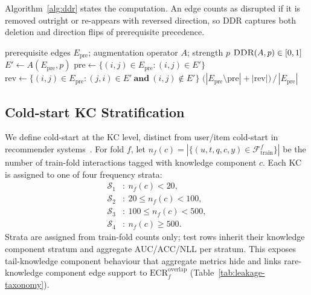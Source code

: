 \documentclass[pdflatex,sn-mathphys-num]{sn-jnl}
\newcommand{\Epre}{\ensuremath{E_{\text{pre}}}}
\newcommand{\KC}{knowledge component}
\newcommand{\DDR}{\textsc{DDR}}
\begin{document}
Algorithm~\ref{alg:ddr} states the computation. An edge counts as disrupted if
it is removed outright or re-appears with reversed direction, so \DDR{}
captures both deletion and direction flips of prerequisite precedence.

\begin{algorithm}[t]
\caption{DAG Disruption Rate (\DDR{})}
\label{alg:ddr}
\begin{algorithmic}[1]
\Require prerequisite edges $\Epre$; augmentation operator $A$; strength $p$
\Ensure $\DDR(A,p)\in[0,1]$
\State $E' \gets A(\Epre, p)$ 
\State $\mathrm{pre} \gets \{(i,j)\in\Epre : (i,j)\in E'\}$ 
\State $\mathrm{rev} \gets \{(i,j)\in\Epre : (j,i)\in E'\ \textbf{and}\ (i,j)\notin E'\}$ 
\State \Return $\big(|\Epre\setminus\mathrm{pre}| + |\mathrm{rev}|\big)\,/\,|\Epre|$
\end{algorithmic}
\end{algorithm}

\subsection{Cold-start KC Stratification}
\label{sec:cold-start}
We define cold-start at the KC level, distinct from user/item
cold-start in recommender systems~\cite{schein2002coldstart}. For fold
$f$, let $n_f(c)=|\{(u,t,q,c,y)\in\mathcal{F}_{\text{train}}^f\}|$ be
the number of train-fold interactions tagged with \KC{} $c$. Each KC
is assigned to one of four frequency strata:
\[
\begin{aligned}
\mathcal{S}_1&:\ n_f(c)<20,\\
\mathcal{S}_2&:\ 20\le n_f(c)<100,\\
\mathcal{S}_3&:\ 100\le n_f(c)<500,\\
\mathcal{S}_4&:\ n_f(c)\ge 500.
\end{aligned}
\]
Strata are assigned from train-fold counts only; test rows inherit their
\KC{} stratum and aggregate AUC/ACC/NLL per stratum. This exposes tail-\KC{}
behaviour that aggregate metrics hide and links rare-\KC{} edge support to
$\mathrm{ECR}^{\mathrm{overlap}}_f$ (Table~\ref{tab:leakage-taxonomy}).
\end{document}
